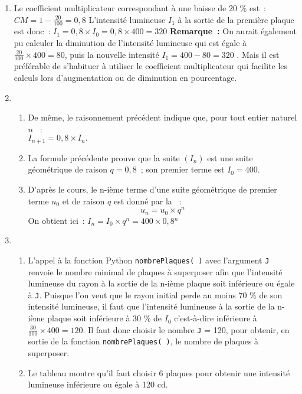 \begin{corrige}
     \begin{enumerate}
          \item
          Le coefficient multiplicateur correspondant à une baisse de 20 \% est~:
          \newpar
          $CM=1 - \frac{ 20 }{ 100 }=0,8$
          \newpar
          L'intensité lumineuse $I_{ 1 }$ à la sortie de la première plaque est donc~:
          \newpar
          $I_{ 1 }=0,8 \times I_{ 0 }=0,8 \times 400=320$
          \medbreak
          \textbf{Remarque~: }On aurait également pu calculer la diminution de l'intensité lumineuse qui est égale à $\frac{ 20 }{ 100 } \times 400=80$, puis la nouvelle intensité $I_{ 1 }=400 - 80=320$ . Mais il est préférable de s'habituer à utiliser le coefficient multiplicateur qui facilite les calculs lors d'augmentation ou de diminution en pourcentage.
          \item
          \begin{enumerate}[label=\alph*.]
               \item
               De même, le raisonnement précédent indique que, pour tout entier naturel $n$ ~: \\
               $I_{ n+1 }=0,8 \times I_{ n }.$
               \item
               La formule précédente prouve que la suite $( I_{ n } )$ est une suite géométrique de raison  $q=0,8$~; son premier terme est $I_{ 0 }=400.$
               \item
               D'après le cours, le n-ième terme d'une suite géométrique de premier terme $u_{ 0 }$ et de raison $q$ est donné par la ~:
               \newpar
               \[
               u_{ n }=u_{ 0 } \times q{}^{ n }
               \]
               On obtient ici~:
               \newpar
               $I_{ n }=I_{ 0 } \times q{}^{ n }=400 \times 0,8{}^{ n }$
          \end{enumerate}
          \item
          \begin{enumerate}[label=\alph*.]
               \item
               L'appel à la fonction Python \texttt{nombrePlaques( )} avec l'argument  \texttt{J} renvoie le nombre minimal de plaques à superposer afin que l'intensité lumineuse du rayon à la sortie de la n-ième plaque soit inférieure ou égale à  \texttt{J}.
               \newpar
               Puisque l'on veut que le rayon initial perde au moins 70 \% de son intensité lumineuse, il faut que l'intensité lumineuse à la sortie de la n-ième plaque soit inférieure à 30 \% de  $I_{ 0 }$ c'est-à-dire inférieure à $\frac{ 30 }{ 100 } \times 400=120.$
               \newpar
               Il faut donc choisir le nombre  \texttt{J} = 120, pour obtenir, en sortie de la fonction \texttt{nombrePlaques( )}, le nombre de plaques à superposer.
               \item
               Le tableau montre qu'il faut choisir 6 plaques pour obtenir une intensité lumineuse inférieure ou égale à 120 cd.
          \end{enumerate}
     \end{enumerate}
\end{corrige}
